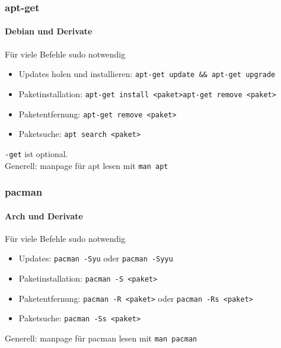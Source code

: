 \documentclass[9pt]{beamer}
\begin{document}
\begin{frame}
 \frametitle{apt-get}
 \framesubtitle{Debian und Derivate}
 \begin{Large}
 Für viele Befehle sudo notwendig
 \begin{itemize}
  \item Updates holen und installieren: \texttt{apt-get update \&\& apt-get upgrade}
  \item Paketinstallation: \texttt{apt-get install <paket>}\texttt{apt-get remove <paket>}
  \item Paketentfernung: \texttt{apt-get remove <paket>}
  \item Paketsuche:  \texttt{apt search <paket>}
 \end{itemize}
 \texttt{-get} ist optional.\\
 Generell: manpage für apt lesen mit \texttt{man apt}
 \end{Large}

\end{frame}

\begin{frame}
 \frametitle{pacman}
 \framesubtitle{Arch und Derivate}
 \begin{Large}
  Für viele Befehle sudo notwendig
 \begin{itemize}
  \item Updates: \texttt{pacman -Syu} oder \texttt{pacman -Syyu}
  \item Paketinstallation: \texttt{pacman -S <paket>}
  \item Paketentfernung: \texttt{pacman -R <paket>} oder \texttt{pacman -Rs <paket>}
  \item Paketsuche: \texttt{pacman -Ss <paket>}
 \end{itemize}
 Generell: manpage für pacman lesen mit \texttt{man pacman}
 \end{Large}
\end{frame}
\end{document}
